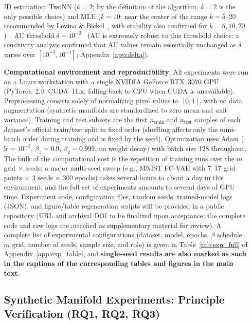 \documentclass[make,article,submit,pdftex,moreauthors]{Definitions/mdpi}
\begin{document}
ID estimation: TwoNN ($k=2$; by the definition of the algorithm, $k=2$ is the only possible choice) and MLE ($k=10$; near the center of the range $k=5$--20 recommended by Levina \& Bickel~\cite{levina2005mle}, with stability also confirmed for $k=5,10,20$)~\cite{facco2017twonn,levina2005mle}.
AU threshold $\delta = 10^{-2}$~\cite{lucas2019elbo} (AU is extremely robust to this threshold choice: a sensitivity analysis confirmed that AU values remain essentially unchanged as $\delta$ varies over $[10^{-3}, 10^{-1}]$; Appendix~\ref{app:delta}).

\textbf{Computational environment and reproducibility}:
All experiments were run on a Linux workstation with a single NVIDIA GeForce
RTX~3070 GPU (PyTorch~2.0, CUDA~11.x; falling back to CPU when CUDA is unavailable).
Preprocessing consists solely of normalizing pixel values to $[0,1]$, with no
data augmentation (synthetic manifolds are standardized to zero mean and unit
variance).
Training and test subsets are the first $n_\mathrm{train}$ and $n_\mathrm{test}$
samples of each dataset's official train/test split in fixed order (shuffling
affects only the mini-batch order during training and is fixed by the seed).
Optimization uses Adam ($\mathrm{lr} = 10^{-3}$, $\beta_1 = 0.9$,
$\beta_2 = 0.999$, no weight decay) with batch size 128 throughout.
The bulk of the computational cost is the repetition of training runs over the
$m$ grid $\times$ seeds; a major multi-seed sweep (e.g., MNIST FC-VAE with 7--17
grid points $\times$ 3 seeds $\times$ 300 epochs) takes several hours to about a
day in this environment, and the full set of experiments amounts to several days
of GPU time.
Experiment code, configuration files, random seeds, trained-model logs (JSON),
and figure/table regeneration scripts will be provided in a public repository
(URL and archival DOI to be finalized upon acceptance; the complete code and raw
logs are attached as supplementary material for review).
A complete list of experimental configurations (dataset, model, epochs, $\beta$
schedule, $m$ grid, number of seeds, sample size, and role) is given in
Table~\ref{tab:exp_full} of Appendix~\ref{app:exp_table}, and
\textbf{single-seed results are also marked as such in the captions of the
corresponding tables and figures in the main text}.

\subsection{Synthetic Manifold Experiments: Principle Verification (RQ1, RQ2, RQ3)}\label{sec:exp_synthetic}
\end{document}
